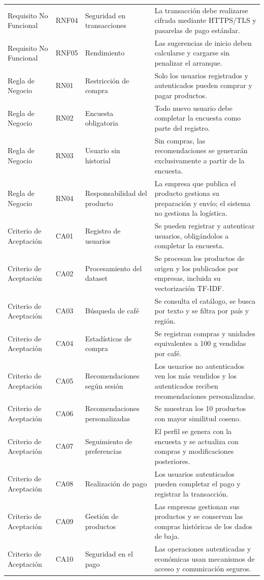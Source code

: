 \begin{longtable}{p{2.8cm}p{1.1cm}p{4.1cm}p{7cm}}
Requisito No Funcional & RNF04 & Seguridad en transacciones & La transacción debe realizarse cifrada mediante HTTPS/TLS y pasarelas de pago estándar.\\
Requisito No Funcional & RNF05 & Rendimiento & Las sugerencias de inicio deben calcularse y cargarse sin penalizar el arranque.\\
Regla de Negocio & RN01 & Restricción de compra & Solo los usuarios registrados y autenticados pueden comprar y pagar productos.\\
Regla de Negocio & RN02 & Encuesta obligatoria & Todo nuevo usuario debe completar la encuesta como parte del registro.\\
Regla de Negocio & RN03 & Usuario sin historial & Sin compras, las recomendaciones se generarán exclusivamente a partir de la encuesta.\\
Regla de Negocio & RN04 & Responsabilidad del producto & La empresa que publica el producto gestiona su preparación y envío; el sistema no gestiona la logística.\\
Criterio de Aceptación & CA01 & Registro de usuarios & Se pueden registrar y autenticar usuarios, obligándolos a completar la encuesta.\\
Criterio de Aceptación & CA02 & Procesamiento del dataset & Se procesan los productos de origen y los publicados por empresas, incluida su vectorización TF-IDF.\\
Criterio de Aceptación & CA03 & Búsqueda de café & Se consulta el catálogo, se busca por texto y se filtra por país y región.\\
Criterio de Aceptación & CA04 & Estadísticas de compra & Se registran compras y unidades equivalentes a 100 g vendidas por café.\\
Criterio de Aceptación & CA05 & Recomendaciones según sesión & Los usuarios no autenticados ven los más vendidos y los autenticados reciben recomendaciones personalizadas.\\
Criterio de Aceptación & CA06 & Recomendaciones personalizadas & Se muestran los 10 productos con mayor similitud coseno.\\
Criterio de Aceptación & CA07 & Seguimiento de preferencias & El perfil se genera con la encuesta y se actualiza con compras y modificaciones posteriores.\\
Criterio de Aceptación & CA08 & Realización de pago & Los usuarios autenticados pueden completar el pago y registrar la transacción.\\
Criterio de Aceptación & CA09 & Gestión de productos & Las empresas gestionan sus productos y se conservan las compras históricas de los dados de baja.\\
Criterio de Aceptación & CA10 & Seguridad en el pago & Las operaciones autenticadas y económicas usan mecanismos de acceso y comunicación seguros.\\
\hline
\end{longtable}

